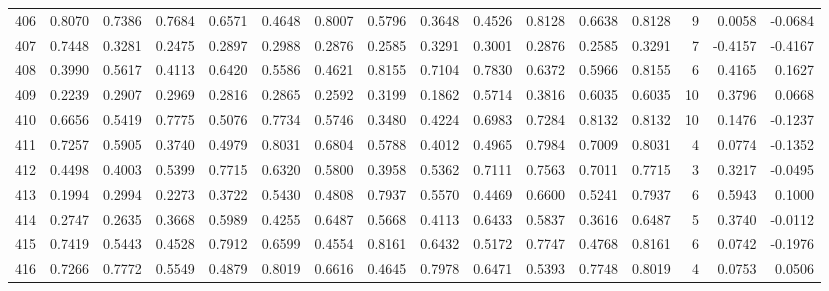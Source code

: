 \begin{tabular}{lrrrrrrrrrrrrrrr}
406 &      0.8070 &  0.7386 &  0.7684 &  0.6571 &  0.4648 &  0.8007 &  0.5796 &  0.3648 &  0.4526 &  0.8128 &   0.6638 &     0.8128 &      9 &                    0.0058 &                    -0.0684 \\
407 &      0.7448 &  0.3281 &  0.2475 &  0.2897 &  0.2988 &  0.2876 &  0.2585 &  0.3291 &  0.3001 &  0.2876 &   0.2585 &     0.3291 &      7 &                   -0.4157 &                    -0.4167 \\
408 &      0.3990 &  0.5617 &  0.4113 &  0.6420 &  0.5586 &  0.4621 &  0.8155 &  0.7104 &  0.7830 &  0.6372 &   0.5966 &     0.8155 &      6 &                    0.4165 &                     0.1627 \\
409 &      0.2239 &  0.2907 &  0.2969 &  0.2816 &  0.2865 &  0.2592 &  0.3199 &  0.1862 &  0.5714 &  0.3816 &   0.6035 &     0.6035 &     10 &                    0.3796 &                     0.0668 \\
410 &      0.6656 &  0.5419 &  0.7775 &  0.5076 &  0.7734 &  0.5746 &  0.3480 &  0.4224 &  0.6983 &  0.7284 &   0.8132 &     0.8132 &     10 &                    0.1476 &                    -0.1237 \\
411 &      0.7257 &  0.5905 &  0.3740 &  0.4979 &  0.8031 &  0.6804 &  0.5788 &  0.4012 &  0.4965 &  0.7984 &   0.7009 &     0.8031 &      4 &                    0.0774 &                    -0.1352 \\
412 &      0.4498 &  0.4003 &  0.5399 &  0.7715 &  0.6320 &  0.5800 &  0.3958 &  0.5362 &  0.7111 &  0.7563 &   0.7011 &     0.7715 &      3 &                    0.3217 &                    -0.0495 \\
413 &      0.1994 &  0.2994 &  0.2273 &  0.3722 &  0.5430 &  0.4808 &  0.7937 &  0.5570 &  0.4469 &  0.6600 &   0.5241 &     0.7937 &      6 &                    0.5943 &                     0.1000 \\
414 &      0.2747 &  0.2635 &  0.3668 &  0.5989 &  0.4255 &  0.6487 &  0.5668 &  0.4113 &  0.6433 &  0.5837 &   0.3616 &     0.6487 &      5 &                    0.3740 &                    -0.0112 \\
415 &      0.7419 &  0.5443 &  0.4528 &  0.7912 &  0.6599 &  0.4554 &  0.8161 &  0.6432 &  0.5172 &  0.7747 &   0.4768 &     0.8161 &      6 &                    0.0742 &                    -0.1976 \\
416 &      0.7266 &  0.7772 &  0.5549 &  0.4879 &  0.8019 &  0.6616 &  0.4645 &  0.7978 &  0.6471 &  0.5393 &   0.7748 &     0.8019 &      4 &                    0.0753 &                     0.0506 \\

\end{tabular}
